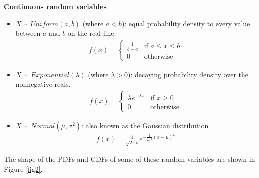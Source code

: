 \documentclass{article}
\begin{document}
\textbf{Continuous random variables}
\begin{itemize}
\item $X \sim Uniform(a,b)$ (where $a < b$): equal probability density to every value between $a$ and $b$ on the real line.
  \begin{eqnarray*}
    f(x) = \begin{cases} 
      \frac{1}{b - a} & \text{if $a \le x \le b$} \\
      0 & \text{otherwise}
    \end{cases}
  \end{eqnarray*}
\item $X \sim Exponential(\lambda)$ (where $\lambda > 0$): decaying probability density over the nonnegative reals.
  \begin{eqnarray*}
    f(x) = \begin{cases}
      \lambda e^{-\lambda x} & \text{if $x \ge 0$} \\
      0 & \text{otherwise}
    \end{cases}
  \end{eqnarray*}
\item $X \sim Normal(\mu, \sigma^2)$: also known as the Gaussian distribution
  \begin{eqnarray*}
    f(x) = \frac{1}{\sqrt{2\pi} \sigma} e^{-\frac{1}{2\sigma^2} (x - \mu)^2}
  \end{eqnarray*}
\end{itemize}
The shape of the PDFs and CDFs of some of these random variables are shown in Figure \ref{fig2}.
\end{document}
